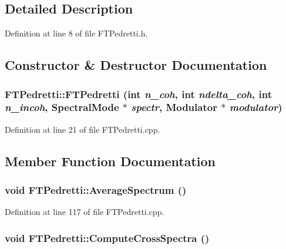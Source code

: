 \subsection{Detailed Description}


Definition at line 8 of file FTPedretti.h.



\subsection{Constructor \& Destructor Documentation}
\hypertarget{classFTPedretti_a8aa7bb8087a0e003f495e0ca98393867}{
\subsubsection[{FTPedretti}]{\setlength{\rightskip}{0pt plus 5cm}FTPedretti::FTPedretti (int {\em n\_\-coh}, \/  int {\em ndelta\_\-coh}, \/  int {\em n\_\-incoh}, \/  {\bf SpectralMode} $\ast$ {\em spectr}, \/  {\bf Modulator} $\ast$ {\em modulator})}}
\label{classFTPedretti_a8aa7bb8087a0e003f495e0ca98393867}


Definition at line 21 of file FTPedretti.cpp.



\subsection{Member Function Documentation}
\hypertarget{classFTPedretti_ac229ccfe757c2b890fe465ef7367aebe}{
\subsubsection[{AverageSpectrum}]{\setlength{\rightskip}{0pt plus 5cm}void FTPedretti::AverageSpectrum ()}}
\label{classFTPedretti_ac229ccfe757c2b890fe465ef7367aebe}


Definition at line 117 of file FTPedretti.cpp.

\hypertarget{classFTPedretti_a12bed5efb6c39dd3bf07e696c04a215b}{
\subsubsection[{ComputeCrossSpectra}]{\setlength{\rightskip}{0pt plus 5cm}void FTPedretti::ComputeCrossSpectra ()}}
\label{classFTPedretti_a12bed5efb6c39dd3bf07e696c04a215b}


